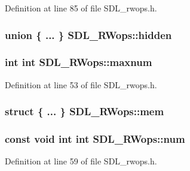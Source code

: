 Definition at line 85 of file S\+D\+L\+\_\+rwops.\+h.

\hypertarget{struct_s_d_l___r_wops_a8ac2a4e01366f7bb9f41956beffa759d}{}
\subsubsection[{hidden}]{\setlength{\rightskip}{0pt plus 5cm}union \{ ... \}   S\+D\+L\+\_\+\+R\+Wops\+::hidden}\label{struct_s_d_l___r_wops_a8ac2a4e01366f7bb9f41956beffa759d}
\hypertarget{struct_s_d_l___r_wops_a60f37bebd3385e0fba9164a45c064e01}{}
\subsubsection[{maxnum}]{ {\bf int} {\bf int} S\+D\+L\+\_\+\+R\+Wops\+::maxnum}\label{struct_s_d_l___r_wops_a60f37bebd3385e0fba9164a45c064e01}


Definition at line 53 of file S\+D\+L\+\_\+rwops.\+h.

\hypertarget{struct_s_d_l___r_wops_a2610a73a002f6f1eb01996e968034803}{}
\subsubsection[{mem}]{\setlength{\rightskip}{0pt plus 5cm}struct \{ ... \}   S\+D\+L\+\_\+\+R\+Wops\+::mem}\label{struct_s_d_l___r_wops_a2610a73a002f6f1eb01996e968034803}
\hypertarget{struct_s_d_l___r_wops_afb1b7d6d83dcf6b1d4fdd2b4041577e2}{}
\subsubsection[{num}]{\setlength{\rightskip}{0pt plus 5cm}const {\bf void} {\bf int} {\bf int} S\+D\+L\+\_\+\+R\+Wops\+::num}\label{struct_s_d_l___r_wops_afb1b7d6d83dcf6b1d4fdd2b4041577e2}


Definition at line 59 of file S\+D\+L\+\_\+rwops.\+h.

\hypertarget{struct_s_d_l___r_wops_a71fb283863acfd186d664f4f2a7eb7d0}{}
